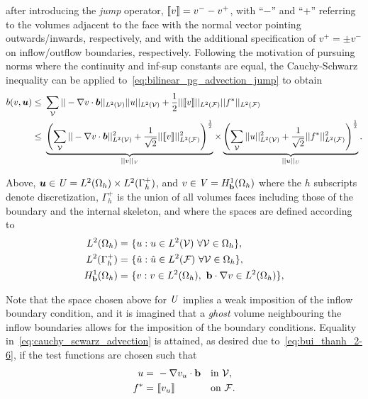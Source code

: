 after introducing the \textit{jump} operator, ${\llbracket v\rrbracket} = v^- - v^+ $, with ``$-$'' and ``$+$'' referring to the
volumes adjacent to the face with the normal vector pointing outwards/inwards, respectively, and with the additional
specification of $v^+ = \pm v^-$ on inflow/outflow boundaries, respectively. Following the motivation of pursuing norms
where the continuity and inf-sup constants are equal, the Cauchy-Schwarz inequality can be applied
to~\eqref{eq:bilinear_pg_advection_jump} to obtain
\begin{align} \label{eq:cauchy_scwarz_advection}
b(v,\varg{u})
\le\ & \sum_{\fe{V}}
|| - \nabla v \cdot \varv{b} ||_{L^2(\fe{V})} || u ||_{L^2(\fe{V})}
+
\frac{1}{2} ||\jump{v}||_{L^2(\fe{F})} ||f^*||_{L^2(\fe{F})} \\
\le\ &
\underbrace{\left(
\sum_{\fe{V}} || - \nabla v \cdot \varv{b} ||^2_{L^2(\fe{V})} + \frac{1}{\sqrt{2}} ||\jump{v}||^2_{L^2(\fe{F})}
\right)^\frac{1}{2}}_{||v||_\fspace{V}}
\times
\underbrace{\left(
\sum_{\fe{V}} || u ||^2_{L^2(\fe{V})} + \frac{1}{\sqrt{2}} ||f^*||^2_{L^2(\fe{F})}
\right)^\frac{1}{2}}_{||u||_\fspace{U}}.
\end{align}

Above, $\mathit{\bm{{u}}} \in \mathit{{{U}}} = L^2(\Omega_h) \times L^2(\Gamma^+_h)$, and $v \in \mathit{{{V}}} = H^1_{\mathbf{{b}}}(\Omega_h)$
where the $h$ subscripts denote discretization, $\Gamma^+_h$ is the union of all volumes faces
including those of the boundary and the internal skeleton, and where the spaces are defined according to
\begin{align}
L^2(\Omega_h)
=\ & \{ u : u \in L^2(\fe{V})\ \forall \fe{V} \in \Omega_h \}, \\
L^2(\Gamma^+_h)
=\ & \{ \hat{u} : \hat{u} \in L^2(\fe{F})\ \forall \fe{V} \in \Omega_h \}, \\
H^1_{\vect{b}}(\Omega_h)
=\ & \{ v : v \in L^2(\Omega_h),\ \vect{b} \cdot \nabla v \in L^2(\Omega_h) \},
\end{align}

Note that the space chosen above for $\mathit{{{U}}}$ implies a weak imposition of the inflow boundary condition, and it is
imagined that a \textit{ghost} volume neighbouring the inflow boundaries allows for the imposition of the boundary
conditions. Equality in~\eqref{eq:cauchy_scwarz_advection} is attained, as desired due to~\eqref{eq:bui_thanh_2-6}, if
the test functions are chosen such that
\begin{align}
u =\ & -\nabla v_u \cdot \vect{b} && \text{in}\ \fe{V}, \\
f^* =\ & \jump{v_u} && \text{on}\ \fe{F}.
\end{align}

